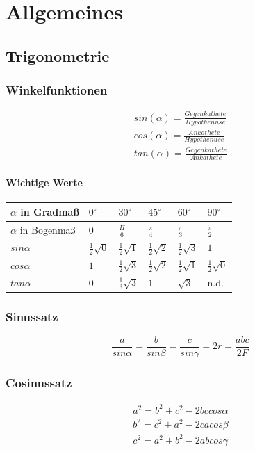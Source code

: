 \documentclass[12pt,a4paper]{article}%
\numberwithin{equation}{section}
\newcommand{\subsubsubsection}{\paragraph}
\numberwithin{equation}{subsection}
\begin{document}
\newpage

\section{Allgemeines}
	\subsection{Trigonometrie}
	  \subsubsection{Winkelfunktionen}
	  \begin{align}
	    sin(\alpha) = \frac{Gegenkathete}{Hypothenuse}\\
	    cos(\alpha) = \frac{Ankathete}{Hypothenuse}\\
	    tan(\alpha) = \frac{Gegenkathete}{Ankathete} \label{eq:trigo_Winkelf}
	  \end{align}
	  
	  \subsubsubsection{Wichtige Werte}
	  \renewcommand{\arraystretch}{1.5}
	  \begin{tabular}{|p{3.2cm}|p{1.8cm}|p{1.8cm}|p{1.8cm}|p{1.8cm}|p{1.8cm}|}\hline
	  $\alpha$ in Gradmaß & $0^{\circ}$ & $30^{\circ}$ & $45^{\circ}$ & $60^{\circ}$ & $90^{\circ}$ \\ \hline
	  $\alpha$ in Bogenmaß & $0$ & $\frac{\Pi}{6}$ & $\frac{\pi}{4}$ & $\frac{\pi}{3}$ & $\frac{\pi}{2}$ \\ \hline
	  $sin\alpha$ & $\frac{1}{2}\sqrt{0}$ & $\frac{1}{2}\sqrt{1}$ & $\frac{1}{2} \sqrt{2}$ & $\frac{1}{2}\sqrt{3}$ & $1$ \\ \hline
	  $cos\alpha$ & $1$ & $\frac{1}{2}\sqrt{3}$ & $\frac{1}{2}\sqrt{2}$ & $\frac{1}{2}\sqrt{1}$ & $\frac{1}{2}\sqrt{0}$ \\ \hline
	  $tan\alpha$ & $0$ & $\frac{1}{3}\sqrt{3}$ & $1$ & $\sqrt{3}$ & n.d. \\ \hline
	  \end{tabular}
	  \renewcommand{\arraystretch}{1}
	  
	  \subsubsection{Sinussatz}
	  \begin{equation}
	    \frac{a}{sin\alpha} = \frac{b}{sin\beta} = \frac{c}{sin\gamma} = 2r = \frac{abc}{2F} \label{eq:allg_sinussatz}  
	  \end{equation}
	  
	  \subsubsection{Cosinussatz}
	  \begin{align}   
	    a^2 = b^2 + c^2 - 2bc cos\alpha\\
	    b^2 = c^2 + a^2 - 2ca cos\beta\\
	    c^2 = a^2 + b^2 - 2ab cos\gamma \label{eq:trigo_cosinussatz}
	  \end{align}
	  
\end{document}
